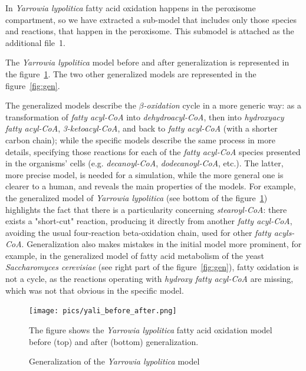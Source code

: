 \documentclass[10pt]{bmc_article}
\newenvironment{bmcformat}{\baselineskip20pt\sloppy\setboolean{publ}{false}}{\baselineskip20pt\sloppy}
\begin{document}
\begin{bmcformat}
In \textit{Yarrowia lypolitica} fatty acid oxidation happens in the peroxisome compartment, so we have extracted a sub-model that includes only those species and reactions, that happen in the peroxisome. This submodel is attached as the additional file~1. 

The \textit{Yarrowia lypolitica} model before and after generalization is represented in the figure~\ref{fig:yali}.
The two other generalized models are represented in the figure~\ref{fig:gen}.

The generalized models describe the \textit{$\beta$-oxidation} cycle in a more generic way: as a transformation of \textit{fatty acyl-CoA} into \textit{dehydroacyl-CoA}, then into \textit{hydroxyacy fatty acyl-CoA}, \textit{3-ketoacyl-CoA}, and back to \textit{fatty acyl-CoA} (with a shorter carbon chain); while the specific models describe the same process in more details, specifying those reactions for each of the \textit{fatty acyl-CoA} species presented in the organisms' cells (e.g. \textit{decanoyl-CoA}, \textit{dodecanoyl-CoA}, etc.). The latter, more precise model, is needed for a simulation, while the more general one is clearer to a human, and reveals the main properties of the models. For example, the generalized model of  \textit{Yarrowia lypolitica} (see bottom of the figure~\ref{fig:yali}) highlights the fact that there is a particularity concerning \textit{stearoyl-CoA}: there exists a "short-cut" reaction, producing it directly from another \textit{fatty acyl-CoA}, avoiding the usual four-reaction beta-oxidation chain, used for other \textit{fatty acyls-CoA}. Generalization also makes mistakes in the initial model more prominent, for example, in the generalized model of fatty acid metabolism of the yeast \textit{Saccharomyces cerevisiae} (see right part of the figure~\ref{fig:gen}), fatty oxidation is not a cycle, as the reactions operating with \textit{hydroxy fatty acyl-CoA} are missing, which was not that obvious in the specific model.
 
\begin{figure}  
\texttt{[image: pics/yali\_before\_after.png]} 

      The figure shows the \textit{Yarrowia lypolitica} fatty acid oxidation model before (top) and after (bottom) generalization.
\caption{Generalization of the \textit{Yarrowia lypolitica} model}
\label{fig:yali}
\end{figure}


\end{bmcformat}
\end{document}
